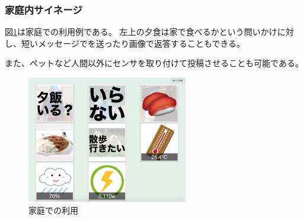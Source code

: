 \subsubsection{家庭内サイネージ}

図\ref{home}は家庭での利用例である。
左上の夕食は家で食べるかという問いかけに対し、短いメッセージでを送ったり画像で返答することもできる。

また、ペットなど人間以外にセンサを取り付けて投稿させることも可能である。

\begin{figure}[h]
\centering
\includegraphics[width=7cm]{images/home.eps}
\caption{家庭での利用}
\label{home}
\end{figure}